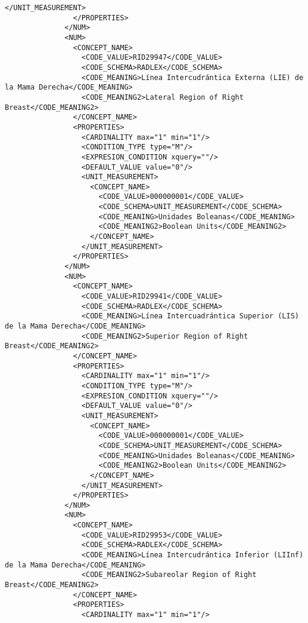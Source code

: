 \begin{lstlisting}[label=dicom-report,caption=Informe estructurado de una exploración de mama]
                  </UNIT_MEASUREMENT>
                </PROPERTIES>
              </NUM>
              <NUM>
                <CONCEPT_NAME>
                  <CODE_VALUE>RID29947</CODE_VALUE>
                  <CODE_SCHEMA>RADLEX</CODE_SCHEMA>
                  <CODE_MEANING>Línea Intercudrántica Externa (LIE) de la Mama Derecha</CODE_MEANING>
                  <CODE_MEANING2>Lateral Region of Right Breast</CODE_MEANING2>
                </CONCEPT_NAME>
                <PROPERTIES>
                  <CARDINALITY max="1" min="1"/>
                  <CONDITION_TYPE type="M"/>
                  <EXPRESION_CONDITION xquery=""/>
                  <DEFAULT_VALUE value="0"/>
                  <UNIT_MEASUREMENT>
                    <CONCEPT_NAME>
                      <CODE_VALUE>000000001</CODE_VALUE>
                      <CODE_SCHEMA>UNIT_MEASUREMENT</CODE_SCHEMA>
                      <CODE_MEANING>Unidades Boleanas</CODE_MEANING>
                      <CODE_MEANING2>Boolean Units</CODE_MEANING2>
                    </CONCEPT_NAME>
                  </UNIT_MEASUREMENT>
                </PROPERTIES>
              </NUM>
              <NUM>
                <CONCEPT_NAME>
                  <CODE_VALUE>RID29941</CODE_VALUE>
                  <CODE_SCHEMA>RADLEX</CODE_SCHEMA>
                  <CODE_MEANING>Línea Intercuadrántica Superior (LIS) de la Mama Derecha</CODE_MEANING>
                  <CODE_MEANING2>Superior Region of Right Breast</CODE_MEANING2>
                </CONCEPT_NAME>
                <PROPERTIES>
                  <CARDINALITY max="1" min="1"/>
                  <CONDITION_TYPE type="M"/>
                  <EXPRESION_CONDITION xquery=""/>
                  <DEFAULT_VALUE value="0"/>
                  <UNIT_MEASUREMENT>
                    <CONCEPT_NAME>
                      <CODE_VALUE>000000001</CODE_VALUE>
                      <CODE_SCHEMA>UNIT_MEASUREMENT</CODE_SCHEMA>
                      <CODE_MEANING>Unidades Boleanas</CODE_MEANING>
                      <CODE_MEANING2>Boolean Units</CODE_MEANING2>
                    </CONCEPT_NAME>
                  </UNIT_MEASUREMENT>
                </PROPERTIES>
              </NUM>
              <NUM>
                <CONCEPT_NAME>
                  <CODE_VALUE>RID29953</CODE_VALUE>
                  <CODE_SCHEMA>RADLEX</CODE_SCHEMA>
                  <CODE_MEANING>Línea Intercudrántica Inferior (LIInf) de la Mama Derecha</CODE_MEANING>
                  <CODE_MEANING2>Subareolar Region of Right Breast</CODE_MEANING2>
                </CONCEPT_NAME>
                <PROPERTIES>
                  <CARDINALITY max="1" min="1"/>

\end{lstlisting}
